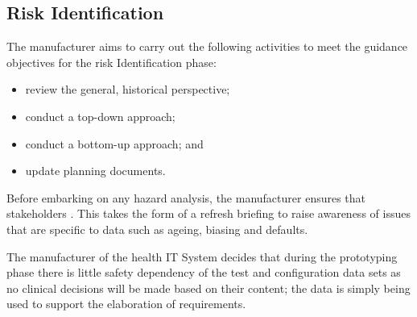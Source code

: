 \subsection{Risk Identification}
\begin{minipage}[t]{0.73\textwidth}
  The manufacturer aims to carry out the following activities to meet the guidance objectives for the risk Identification phase:
  \begin{itemize}
    \item review the general, historical perspective;
    \item conduct a top-down approach;
    \item conduct a bottom-up approach; and
    \item update planning documents.
  \end{itemize}
\end{minipage}
\begin{minipage}[t]{0.25\textwidth}
  \centering{}
\end{minipage}

Before embarking on any hazard analysis, the manufacturer ensures that \glspl{stakeholder} . This takes the form of a refresh briefing to raise awareness of issues that are specific to data such as ageing, biasing and defaults.

The manufacturer of the health IT System decides that during the prototyping phase there is little safety dependency of the test and \gls{configuration data} sets as no clinical decisions will be made based on their content; the data is simply being used to support the elaboration of requirements.

